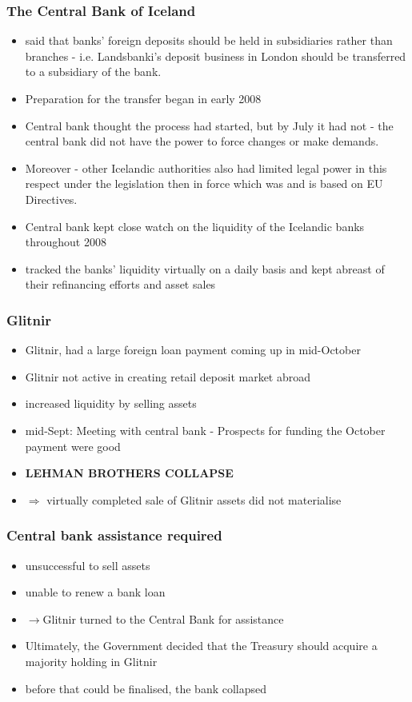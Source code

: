 \documentclass[11pt]{beamer}
\begin{document}
\begin{frame}
\frametitle{The Central Bank of Iceland}
\begin{itemize}
\item said that banks’ foreign deposits should be held in subsidiaries rather than branches - i.e. Landsbanki’s deposit business in London should be transferred to a subsidiary of the bank.
\item Preparation for the transfer began in early 2008
\item Central bank thought the process had started, but by July it had not - the central bank did not have the power to force changes or make demands.
\item Moreover - other Icelandic authorities also had limited legal power in this respect under the legislation then in force which was and is based on EU Directives.
\item Central bank kept close watch on the liquidity of the Icelandic banks throughout 2008
\item  tracked the banks’ liquidity virtually on a daily basis and kept abreast of their refinancing efforts and asset sales

\end{itemize}
\end{frame}


\begin{frame}
\frametitle{Glitnir}
\begin{itemize}
\item Glitnir, had a large foreign loan payment coming up in mid-October
\item Glitnir not active in creating retail deposit market abroad
\item increased liquidity by selling assets
\item mid-Sept: Meeting with central bank - Prospects for funding the October payment were good
\item \textbf{LEHMAN BROTHERS COLLAPSE}
\item $\Rightarrow$  virtually completed sale of Glitnir assets did not materialise
\end{itemize}
\end{frame}

\begin{frame}
\frametitle{Central bank assistance required}
\begin{itemize}
\item unsuccessful to sell assets
\item unable to renew a bank loan
\item $\rightarrow$Glitnir turned to the Central Bank for assistance
\item Ultimately, the Government decided that the Treasury should acquire a majority holding in Glitnir
\item before that could be finalised, the bank collapsed
\end{itemize}


\end{frame}
\end{document}
